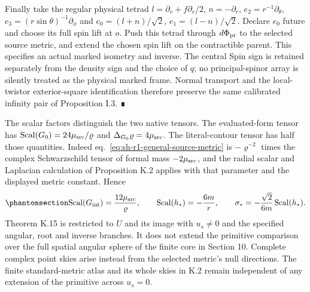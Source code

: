 \documentclass[
  english,
  11pt,
  reqno]{amsart}
\begin{document}
Finally take the regular physical tetrad \(l=\partial_v+f\partial_r/2\),
\(n=-\partial_r\), \(e_2=r^{-1}\partial_\theta\),
\(e_3=(r\sin\theta)^{-1}\partial_\phi\) and \(e_0=(l+n)/\sqrt2\),
\(e_1=(l-n)/\sqrt2\). Declare \(e_0\) future and choose its full spin
lift at \(o\). Push this tetrad through \(d\Phi_{\rm pr}\) to the
selected source metric, and extend the chosen spin lift on the
contractible parent. This specifies an actual marked isometry and
inverse. The central Spin sign is retained separately from the density
sign and the choice of \(q\); no principal-spinor array is silently
treated as the physical marked frame. Normal transport and the
local-twistor exterior-square identification therefore preserve the same
calibrated infinity pair of Proposition I.3. ∎

The scalar factors distinguish the two native tensors. The
evaluated-form tensor has
\(\operatorname{Scal}(G_0)=24\mu_{\rm src}/\varrho\) and
\(\Delta_{G_0}\varrho=4\mu_{\rm src}\). The literal-contour tensor has
half those quantities. Indeed eq.~\ref{eq:sh-r1-general-source-metric}
is \(-\varrho^{-2}\) times the complex Schwarzschild tensor of formal
mass \(-2\mu_{\rm src}\), and the radial scalar and Laplacian
calculation of Proposition K.2 applies with that parameter and the
displayed metric constant. Hence
\begin{equation}\protect\phantomsection\label{eq:sh-r1-calibrated-scalar}{
 \operatorname{Scal}(G_{\rm int})=\frac{12\mu_{\rm src}}{\varrho},
 \qquad \operatorname{Scal}(h_*)=-\frac{6m}{r},\qquad
 \sigma_*=-\frac{\sqrt2}{6m}\operatorname{Scal}(h_*).
}\end{equation} Theorem K.15 is restricted to \(U\) and its image with
\(u_s\ne0\) and the specified angular, root and inverse branches. It
does not extend the primitive comparison over the full spatial angular
sphere of the finite core in Section 10. Complete complex point skies
arise instead from the selected metric's null directions. The finite
standard-metric atlas and its whole skies in K.2 remain independent of
any extension of the primitive across \(u_s=0\).

\protect{}\label{prop:schw-bc-native-generated-composite}
\end{document}
